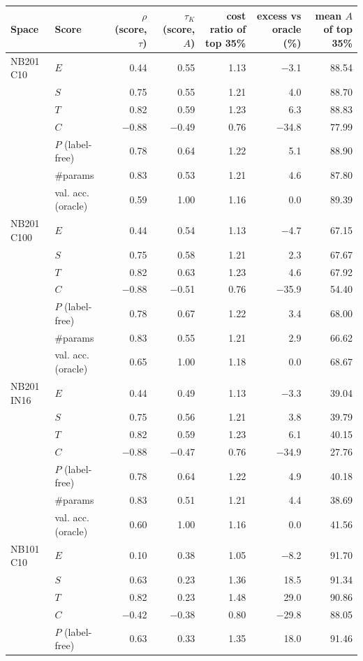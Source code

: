 \begin{tabular}{@{}llrrrrr@{}}
\toprule
Space & Score & $\rho$(score, $\tau$) & $\tau_K$(score, $A$) & cost ratio of top 35\% & excess vs oracle (\%) & mean $A$ of top 35\%\\
\midrule
NB201 C10 & $E$ & 0.44 & 0.55 & 1.13 & $-$3.1 & 88.54\\
 & $S$ & 0.75 & 0.55 & 1.21 & 4.0 & 88.70\\
 & $T$ & 0.82 & 0.59 & 1.23 & 6.3 & 88.83\\
 & $C$ & $-$0.88 & $-$0.49 & 0.76 & $-$34.8 & 77.99\\
 & $P$ (label-free) & 0.78 & 0.64 & 1.22 & 5.1 & 88.90\\
 & \#params & 0.83 & 0.53 & 1.21 & 4.6 & 87.80\\
 & val. acc. (oracle) & 0.59 & 1.00 & 1.16 & 0.0 & 89.39\\
\midrule
NB201 C100 & $E$ & 0.44 & 0.54 & 1.13 & $-$4.7 & 67.15\\
 & $S$ & 0.75 & 0.58 & 1.21 & 2.3 & 67.67\\
 & $T$ & 0.82 & 0.63 & 1.23 & 4.6 & 67.92\\
 & $C$ & $-$0.88 & $-$0.51 & 0.76 & $-$35.9 & 54.40\\
 & $P$ (label-free) & 0.78 & 0.67 & 1.22 & 3.4 & 68.00\\
 & \#params & 0.83 & 0.55 & 1.21 & 2.9 & 66.62\\
 & val. acc. (oracle) & 0.65 & 1.00 & 1.18 & 0.0 & 68.67\\
\midrule
NB201 IN16 & $E$ & 0.44 & 0.49 & 1.13 & $-$3.3 & 39.04\\
 & $S$ & 0.75 & 0.56 & 1.21 & 3.8 & 39.79\\
 & $T$ & 0.82 & 0.59 & 1.23 & 6.1 & 40.15\\
 & $C$ & $-$0.88 & $-$0.47 & 0.76 & $-$34.9 & 27.76\\
 & $P$ (label-free) & 0.78 & 0.64 & 1.22 & 4.9 & 40.18\\
 & \#params & 0.83 & 0.51 & 1.21 & 4.4 & 38.69\\
 & val. acc. (oracle) & 0.60 & 1.00 & 1.16 & 0.0 & 41.56\\
\midrule
NB101 C10 & $E$ & 0.10 & 0.38 & 1.05 & $-$8.2 & 91.70\\
 & $S$ & 0.63 & 0.23 & 1.36 & 18.5 & 91.34\\
 & $T$ & 0.82 & 0.23 & 1.48 & 29.0 & 90.86\\
 & $C$ & $-$0.42 & $-$0.38 & 0.80 & $-$29.8 & 88.05\\
 & $P$ (label-free) & 0.63 & 0.33 & 1.35 & 18.0 & 91.46\\

\end{tabular}

